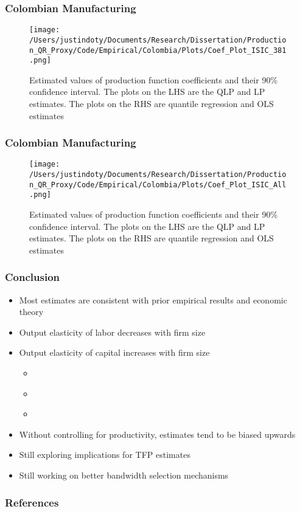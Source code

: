 \documentclass{beamer}
\begin{document}
\begin{frame}
\frametitle{Colombian Manufacturing}
\begin{figure}[ht]
\centering
\texttt{[image: /Users/justindoty/Documents/Research/Dissertation/Production\_QR\_Proxy/Code/Empirical/Colombia/Plots/Coef\_Plot\_ISIC\_381.png]}
\caption{Estimated values of production function coefficients and their 90\% confidence interval. The plots on the LHS are the QLP and LP estimates. The plots on the RHS are quantile regression and OLS estimates}
\end{figure}
\end{frame}

\begin{frame}
\frametitle{Colombian Manufacturing}
\begin{figure}[ht]
\centering
\texttt{[image: /Users/justindoty/Documents/Research/Dissertation/Production\_QR\_Proxy/Code/Empirical/Colombia/Plots/Coef\_Plot\_ISIC\_All.png]}
\caption{Estimated values of production function coefficients and their 90\% confidence interval. The plots on the LHS are the QLP and LP estimates. The plots on the RHS are quantile regression and OLS estimates}
\end{figure}
\end{frame}

\begin{frame}
\frametitle{Conclusion}
\begin{itemize}
	\item Most estimates are consistent with prior empirical results and economic theory
	\item Output elasticity of labor decreases with firm size
	\item Output elasticity of capital increases with firm size
		\begin{itemize}
			\item \textcite{mert}
			\item \textcite{Holmes2008}
			\item \textcite{Rajan1999}
		\end{itemize}
	\item Without controlling for productivity, estimates tend to be biased upwards
	\item Still exploring implications for TFP estimates
	\item Still working on better bandwidth selection mechanisms
\end{itemize}
\end{frame}

\begin{frame}[allowframebreaks]
\frametitle{References}
\printbibliography
\end{frame}
\end{document}
